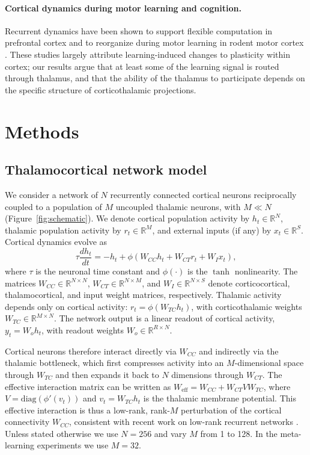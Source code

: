 \documentclass[11pt]{article}
\begin{document}
\paragraph{Cortical dynamics during motor learning and cognition.}
Recurrent dynamics have been shown to support flexible computation in
prefrontal cortex and to reorganize during motor learning in rodent
motor cortex \cite{mante2013context, peters2014emergence,
churchland2012neural}. These studies largely attribute learning-induced
changes to plasticity within cortex; our results argue that at least
some of the learning signal is routed through thalamus, and that the
ability of the thalamus to participate depends on the specific
structure of corticothalamic projections.

\section{Methods}

\subsection{Thalamocortical network model}

We consider a network of $N$ recurrently connected cortical neurons
reciprocally coupled to a population of $M$ uncoupled thalamic neurons,
with $M \ll N$ (Figure~\ref{fig:schematic}). We denote cortical
population activity by $h_t \in \mathbb{R}^N$, thalamic population
activity by $r_t \in \mathbb{R}^M$, and external inputs (if any) by
$x_t \in \mathbb{R}^S$. Cortical dynamics evolve as
\begin{equation}
\tau \frac{d h_t}{d t} = -h_t + \phi\!\left(W_{CC} h_t + W_{CT} r_t + W_I x_t \right),
\end{equation}
where $\tau$ is the neuronal time constant and $\phi(\cdot)$ is the
$\tanh$ nonlinearity. The matrices $W_{CC}\in \mathbb{R}^{N\times N}$,
$W_{CT}\in \mathbb{R}^{N\times M}$, and $W_I\in \mathbb{R}^{N\times S}$
denote corticocortical, thalamocortical, and input weight matrices,
respectively. Thalamic activity depends only on cortical activity:
$r_t = \phi(W_{TC} h_t)$, with corticothalamic weights $W_{TC}\in
\mathbb{R}^{M\times N}$. The network output is a linear readout of
cortical activity, $y_t = W_o h_t$, with readout weights $W_o \in
\mathbb{R}^{R\times N}$.

Cortical neurons therefore interact directly via $W_{CC}$ and
indirectly via the thalamic bottleneck, which first compresses
activity into an $M$-dimensional space through $W_{TC}$ and then
expands it back to $N$ dimensions through $W_{CT}$. The effective
interaction matrix can be written as
$W_{\text{eff}} = W_{CC} + W_{CT} V W_{TC}$,
where $V = \mathrm{diag}(\phi'(v_t))$ and $v_t = W_{TC} h_t$ is the
thalamic membrane potential. This effective interaction is thus a
low-rank, rank-$M$ perturbation of the cortical connectivity $W_{CC}$,
consistent with recent work on low-rank recurrent networks
\cite{mastrogiuseppe2018linking}. Unless stated otherwise we use
$N = 256$ and vary $M$ from 1 to 128. In the meta-learning experiments
we use $M = 32$.
\end{document}
